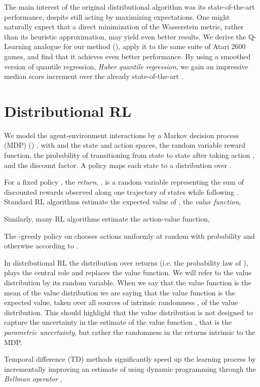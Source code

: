 \documentclass[letterpaper]{article}
\begin{document}
The main interest of the original distributional algorithm was its state-of-the-art performance, despite still acting by maximizing expectations. One might naturally expect that a direct minimization of the Wasserstein metric, rather than its heuristic approximation, may yield even better results. We derive the Q-Learning analogue for our method (), apply it to the same suite of Atari 2600 games, and find that it achieves even better performance. By using a smoothed version of quantile regression, \emph{Huber quantile regression}, we gain an impressive  median score increment over the already state-of-the-art .

\section{Distributional RL}

We model the agent-environment interactions by a Markov decision process (MDP) () \cite{puterman94markov}, with  and  the state and action spaces,  the random variable reward function,  the probability of transitioning from state  to state  after taking action , and  the discount factor. A policy  maps each state  to a distribution over .

For a fixed policy , the \textit{return}, , is a random variable representing the sum of discounted rewards observed along one trajectory of states while following . Standard RL algorithms estimate the expected value of , the \textit{value function}, 

Similarly, many RL algorithms estimate the action-value function,


The -greedy policy on  chooses actions uniformly at random with probability  and otherwise according to . 

In distributional RL the distribution over returns (i.e. the probability law of ), plays the central role and replaces the value function. We will refer to the value distribution by its random variable. When we say that the value function is the mean of the value distribution we are saying that the value function is the expected value, taken over all sources of intrinsic randomness \cite{goldstein1981intrinsic}, of the value distribution. This should highlight that the value distribution is not designed to capture the uncertainty in the estimate of the value function \cite{dearden98bayesian,engel05reinforcement}, that is the \textit{parametric uncertainty}, but rather the randomness in the returns intrinsic to the MDP.

Temporal difference (TD) methods significantly speed up the learning process by incrementally improving an estimate of  using dynamic programming through the \textit{Bellman operator} \cite{bellman57dynamic},
\end{document}
